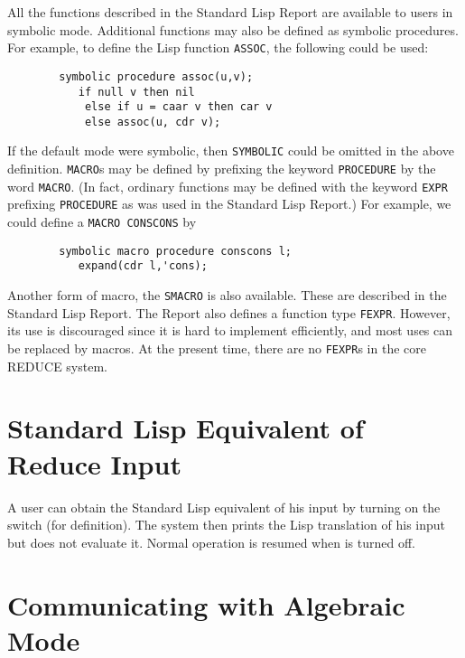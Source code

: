 All the functions described in the Standard Lisp Report are available to
users in symbolic mode. Additional functions may also be defined as
symbolic procedures. For example, to define the Lisp function \texttt{ASSOC},
the following could be used:
\begin{verbatim}
        symbolic procedure assoc(u,v);
           if null v then nil
            else if u = caar v then car v
            else assoc(u, cdr v);
\end{verbatim}
\hypertarget{reserved:MACRO}{}
\hypertarget{reserved:EXPR}{}
If the default mode were symbolic, then \texttt{SYMBOLIC} could be omitted in
the above definition. \texttt{MACRO}s may be defined by
prefixing the keyword \texttt{PROCEDURE} by the word \texttt{MACRO}.
(In fact, ordinary functions may be defined with the keyword \texttt{EXPR}
 prefixing \texttt{PROCEDURE} as was used in the Standard Lisp
Report.) For example, we could define a \texttt{MACRO CONSCONS} by
\begin{verbatim}
        symbolic macro procedure conscons l;
           expand(cdr l,'cons);
\end{verbatim}

\hypertarget{reserved:SMACRO}{}
\hypertarget{reserved:FEXPR}{}
Another form of macro, the \texttt{SMACRO} is also available.
These are described in the Standard Lisp Report.  The Report also defines
a function type \texttt{FEXPR}.
However, its use is discouraged since it is hard to implement efficiently,
and most uses can be replaced by macros.  At the present time, there are
no \texttt{FEXPR}s in the core REDUCE system.

\section{Standard Lisp Equivalent of Reduce Input}
\hypertarget{switch:DEFN}{}

A user can obtain the Standard Lisp equivalent of his {\REDUCE} input by
turning on the switch  (for definition).  The
system then prints the Lisp translation of his input but does not evaluate
it.  Normal operation is resumed when  is turned off.

\section{Communicating with Algebraic Mode}
\hypertarget{command:SHARE}{}


